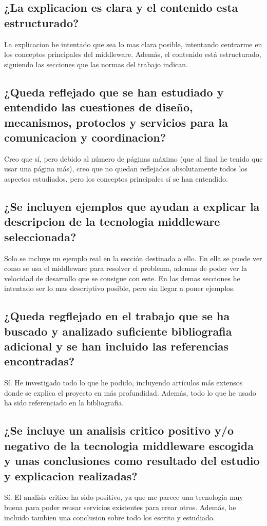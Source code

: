 \documentclass[runningheads]{llncs}
\begin{document}
\subsection{¿La explicacion es clara y el contenido esta estructurado?}
La explicacion he intentado que sea lo mas clara posible, intentando centrarme en los conceptos principales del middleware. Además, el contenido está estructurado, siguiendo las secciones que las normas del trabajo indican.

\subsection{¿Queda reflejado que se han estudiado y entendido las cuestiones de diseño, mecanismos, protoclos y servicios para la comunicacion y coordinacion?}
Creo que sí, pero debido al número de páginas máximo (que al final he tenido que usar una página más), creo que no quedan reflejados absolutamente todos los aspectos estudiados, pero los conceptos principales sí se han entendido.

\subsection{¿Se incluyen ejemplos que ayudan a explicar la descripcion de la tecnologia middleware seleccionada?}
Solo se incluye un ejemplo real en la sección destinada a ello. En ella se puede ver como se usa el middleware para resolver el problema, ademas de poder ver la velocidad de desarrollo que se consigue con este. En las demas secciones he intentado ser lo mas descriptivo posible, pero sin llegar a poner ejemplos.

\subsection{¿Queda regflejado en el trabajo que se ha buscado y analizado suficiente bibliografia adicional y se han incluido las referencias encontradas?}
Sí. He investigado todo lo que he podido, incluyendo artículos más extensos donde se explica el proyecto en más profundidad. Además, todo lo que he usado ha sido referenciado en la bibliografia.

\subsection{¿Se incluye un analisis critico positivo y/o negativo de la tecnologia middleware escogida y unas conclusiones como resultado del estudio y explicacion realizadas?}
Sí. El analisis critico ha sido positivo, ya que me parece una tecnologia muy buena para poder reusar servicios existentes para crear otros. Además, he incluido tambien una conclusion sobre todo los escrito y estudiado.
\end{document}
